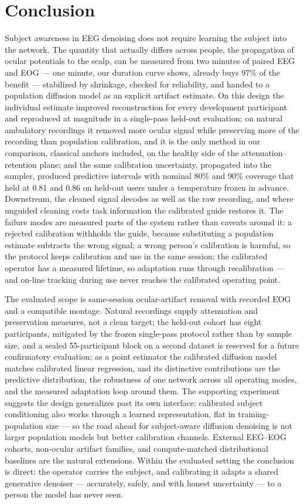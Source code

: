 \section{Conclusion}
\label{sec:conclusion}

Subject awareness in EEG denoising does not require learning the subject into the network. The quantity that actually differs across people, the propagation of ocular potentials to the scalp, can be measured from two minutes of paired EEG and EOG --- one minute, our duration curve shows, already buys 97\% of the benefit --- stabilized by shrinkage, checked for reliability, and handed to a population diffusion model as an explicit artifact estimate. On this design the individual estimate improved reconstruction for every development participant and reproduced at magnitude in a single-pass held-out evaluation; on natural ambulatory recordings it removed more ocular signal while preserving more of the recording than population calibration, and it is the only method in our comparison, classical anchors included, on the healthy side of the attenuation--retention plane; and the same calibration uncertainty, propagated into the sampler, produced predictive intervals with nominal 80\% and 90\% coverage that held at 0.81 and 0.86 on held-out users under a temperature frozen in advance. Downstream, the cleaned signal decodes as well as the raw recording, and where unguided cleaning costs task information the calibrated guide restores it. The failure modes are measured parts of the system rather than caveats around it: a rejected calibration withholds the guide, because substituting a population estimate subtracts the wrong signal; a wrong person's calibration is harmful, so the protocol keeps calibration and use in the same session; the calibrated operator has a measured lifetime, so adaptation runs through recalibration --- and on-line tracking during use never reaches the calibrated operating point.

The evaluated scope is same-session ocular-artifact removal with recorded EOG and a compatible montage. Natural recordings supply attenuation and preservation measures, not a clean target; the held-out cohort has eight participants, mitigated by the frozen single-pass protocol rather than by sample size, and a sealed 55-participant block on a second dataset is reserved for a future confirmatory evaluation; as a point estimator the calibrated diffusion model matches calibrated linear regression, and its distinctive contributions are the predictive distribution, the robustness of one network across all operating modes, and the measured adaptation loop around them. The supporting experiment suggests the design generalizes past its own interface: calibrated subject conditioning also works through a learned representation, flat in training-population size --- so the road ahead for subject-aware diffusion denoising is not larger population models but better calibration channels. External EEG--EOG cohorts, non-ocular artifact families, and compute-matched distributional baselines are the natural extensions. Within the evaluated setting the conclusion is direct: the operator carries the subject, and calibrating it adapts a shared generative denoiser --- accurately, safely, and with honest uncertainty --- to a person the model has never seen.
